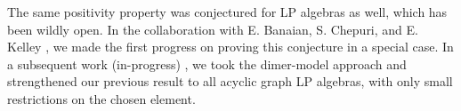 \documentclass[11pt]{amsart}
\newcommand{\Emph}[1]{\textbf{\emph{#1}}}
\begin{document}
The same positivity property was conjectured for LP algebras as well, which has been wildly open. In the collaboration with E. Banaian, S. Chepuri, and E. Kelley \cite{bckz1}, we made the first progress on proving this conjecture in a special case. In a subsequent work (in-progress) \cite{bckz2}, we took the dimer-model approach and strengthened our previous result to all acyclic graph LP algebras, with only small restrictions on the chosen element.

%
\end{document}

